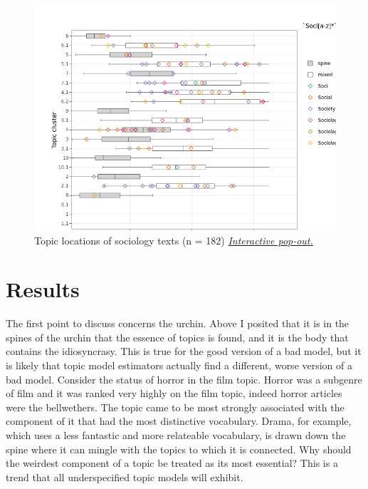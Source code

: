 \documentclass[]{book}
\theoremstyle{definition}
\theoremstyle{definition}
\theoremstyle{definition}
\theoremstyle{remark}
\begin{document}
\begin{figure}

{\centering \includegraphics[width=0.9\linewidth]{03_files/figure-latex/sociology-1} 

}

\caption{Topic locations of sociology texts (n = 182)
\href{https://brooksambrose.github.io/portfolio/exh/sociology.html}{\emph{Interactive
pop-out.}}}\label{fig:sociology}
\end{figure}

\hypertarget{results}{%
\section{Results}\label{results}}

The first point to discuss concerns the urchin. Above I posited that it
is in the spines of the urchin that the essence of topics is found, and
it is the body that contains the idiosyncrasy. This is true for the good
version of a bad model, but it is likely that topic model estimators
actually find a different, worse version of a bad model. Consider the
status of horror in the film topic. Horror was a subgenre of film and it
was ranked very highly on the film topic, indeed horror articles were
the bellwethers. The topic came to be most strongly associated with the
component of it that had the most distinctive vocabulary. Drama, for
example, which uses a less fantastic and more relateable vocabulary, is
drawn down the spine where it can mingle with the topics to which it is
connected. Why should the weirdest component of a topic be treated as
its most essential? This is a trend that all underspecified topic models
will exhibit.
\end{document}
